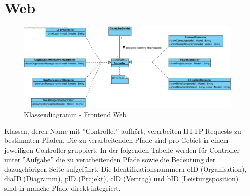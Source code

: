 

\section{Web}

\begin{figure}[h]
	\centering
	\includegraphics[width=\linewidth]{img/diagrams/Frontend Classes.pdf}
	\caption{Klassendiagramm - Frontend Web}
	\label{fig:klassendiagramm-web}
\end{figure}

\noindent
Klassen, deren Name mit ''Controller'' aufhört, verarbeiten HTTP Requests zu bestimmten Pfaden.
Die zu verarbeitenden Pfade sind pro Gebiet in einem jeweiligen Controller gruppiert.
In der folgenden Tabelle werden für Controller unter ''Aufgabe'' die zu verarbeitenden Pfade sowie die Bedeutung der dazugehörigen Seite aufgeführt.
Die Identifikationsnummern oID (Organisation), diaID (Diagramm), pID (Projekt), cID (Vertrag) und bID (Leistungsposition) sind in manche Pfade direkt integriert. \\


